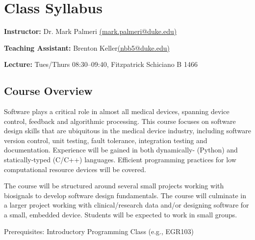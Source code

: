 



\section*{Class Syllabus}

{\bf Instructor:} Dr. Mark Palmeri \href{mailto:mark.palmeri@duke.edu}{(mark.palmeri@duke.edu)}

{\bf Teaching Assistant:} Brenton Keller\href{mailto:brenton.keller@duke.edu}{(nbb5@duke.edu)}

{\bf Lecture:} Tues/Thurs 08:30--09:40, Fitzpatrick Schiciano B 1466

\subsection*{Course Overview}
Software plays a critical role in almost all medical devices, spanning device control, feedback and algorithmic processing.  This course focuses on software design skills that are ubiquitous in the medical device industry, including software version control, unit testing, fault tolerance, integration testing and documentation.  Experience will be gained in both dynamically- (Python) and statically-typed (C/C++) languages.  Efficient programming practices for low computational resource devices will be covered.

The course will be structured around several small projects working with biosignals to develop software design fundamentals.  The course will culminate in a larger project working with clinical/research data and/or designing software for a small, embedded device.  Students will be expected to work in small groups.

Prerequisites: Introductory Programming Class (e.g., EGR103)


